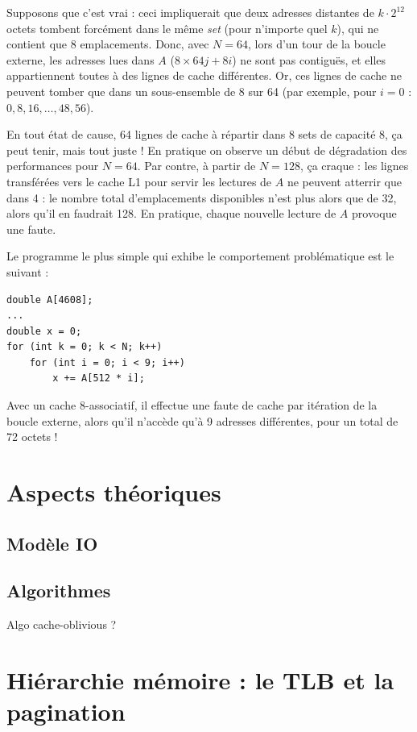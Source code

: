Supposons que c'est vrai : ceci impliquerait que deux adresses distantes de
$k \cdot 2^{12}$ octets tombent forcément dans le même \emph{set} (pour
n'importe quel $k$), qui ne contient que 8 emplacements. Donc, avec $N=64$, lors
d'un tour de la boucle externe, les adresses lues dans $A$
($8 \times 64j + 8i$) ne sont pas contiguës, et elles appartiennent
toutes à des lignes de cache différentes. Or, ces lignes de cache ne peuvent
tomber que dans un sous-ensemble de 8  sur 64 (par exemple, pour
$i=0$ : $0, 8, 16, \dots, 48, 56$).

En tout état de cause, 64 lignes de cache à répartir dans 8 sets de capacité 8,
ça peut tenir, mais tout juste !  En pratique on observe un début de dégradation
des performances pour $N=64$. Par contre, à partir de $N=128$, ça craque : les
lignes transférées vers le cache L1 pour servir les lectures de $A$ ne peuvent
atterrir que dans 4  : le nombre total d'emplacements disponibles
n'est plus alors que de 32, alors qu'il en faudrait 128. En pratique, chaque
nouvelle lecture de $A$ provoque une faute.

Le programme le plus simple qui exhibe le comportement problématique est le
suivant :
\begin{verbatim}
double A[4608];
...
double x = 0;
for (int k = 0; k < N; k++)
    for (int i = 0; i < 9; i++)
        x += A[512 * i];
\end{verbatim}
Avec un cache $8$-associatif, il effectue une faute de cache par itération de la
boucle externe, alors qu'il n'accède qu'à 9 adresses différentes, pour un total
de 72 octets !




\clearpage

\section{Aspects théoriques}

\subsection{Modèle IO}

\subsection{Algorithmes \og {}}

Algo cache-oblivious ?


\section{Hiérarchie mémoire : le TLB et la pagination}

